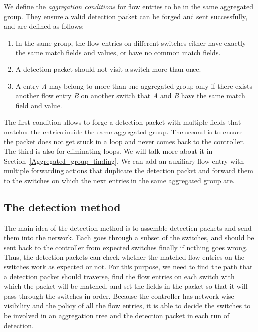 \documentclass[conference]{IEEEtran}
\begin{document}
We define the \textit{aggregation conditions} for flow entries to be in the same aggregated group. They ensure a valid detection packet can be forged and sent successfully, and are defined as follows:
\begin{enumerate}
\item
In the same group, the flow entries on different switches either have exactly the same match fields and values, or have no common match fields.
\item
A detection packet should not visit a switch more than once.
\item
A entry \textit{A} may belong to more than one aggregated group only if there exists another flow entry \textit{B} on another switch that \textit{A} and \textit{B} have the same match field and value.
\end{enumerate}

The first condition allows to forge a detection packet with multiple fields that matches the entries inside the same aggregated group. The second is to ensure the packet does not get stuck in a loop and never comes back to the controller. The third is also for eliminating loops. We will talk more about it in Section~\ref{Aggregated_group_finding}. We can add an auxiliary flow entry with multiple forwarding actions that duplicate the detection packet and forward them to the switches on which the next entries in the same aggregated group are.

\subsection{The detection method}
\label{Detection_method}

The main idea of the detection method is to assemble detection packets and send them into the network. Each goes through a subset of the switches, and should be sent back to the controller from expected switches finally if nothing goes wrong. Thus, the detection packets can check whether the matched flow entries on the switches work as expected or not. For this purpose, we need to find the path that a detection packet should traverse, find the flow entries on each switch with which the packet will be matched, and set the fields in the packet so that it will pass through the switches in order. Because the controller has network-wise visibility and the policy of all the flow entries, it is able to decide the switches to be involved in an aggregation tree and the detection packet in each run of detection. 
\end{document}
